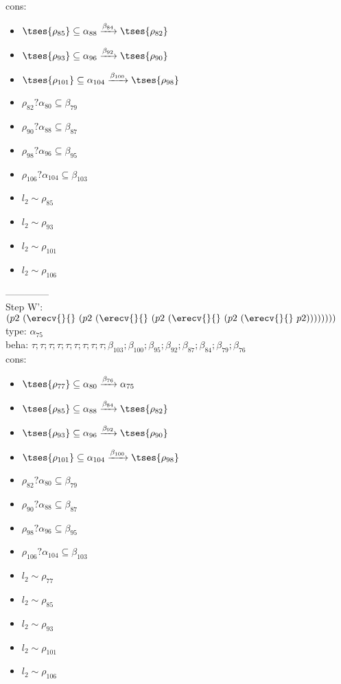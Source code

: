 \documentclass[12pt]{article}
\begin{document}
\\  cons: \begin{itemize}
\item $  \tses{ \rho_{85}} \subseteq \alpha_{88} \xrightarrow{\beta_{84}}  \tses{ \rho_{82}} $
\item $  \tses{ \rho_{93}} \subseteq \alpha_{96} \xrightarrow{\beta_{92}}  \tses{ \rho_{90}} $
\item $  \tses{ \rho_{101}} \subseteq \alpha_{104} \xrightarrow{\beta_{100}}  \tses{ \rho_{98}} $
\item $ \rho_{82}?\alpha_{80} \subseteq \beta_{79} $
\item $ \rho_{90}?\alpha_{88} \subseteq \beta_{87} $
\item $ \rho_{98}?\alpha_{96} \subseteq \beta_{95} $
\item $ \rho_{106}?\alpha_{104} \subseteq \beta_{103} $
\item $ l_{2} \sim\rho_{85} $
\item $ l_{2} \sim\rho_{93} $
\item $ l_{2} \sim\rho_{101} $
\item $ l_{2} \sim\rho_{106} $
\end{itemize} 
  --------------\\ 
Step W': $ (p2~(\erecv{}{}~(p2~(\erecv{}{}~(p2~(\erecv{}{}~(p2~(\erecv{}{}~p2)))))))) $\\
  type: $ \alpha_{75} $ 
\\  beha: $ \tau; \tau; \tau; \tau; \tau; \tau; \tau; \tau; \tau; \beta_{103}; \beta_{100}; \beta_{95}; \beta_{92}; \beta_{87}; \beta_{84}; \beta_{79}; \beta_{76} $ 
\\  cons: \begin{itemize}
\item $  \tses{ \rho_{77}} \subseteq \alpha_{80} \xrightarrow{\beta_{76}} \alpha_{75} $
\item $  \tses{ \rho_{85}} \subseteq \alpha_{88} \xrightarrow{\beta_{84}}  \tses{ \rho_{82}} $
\item $  \tses{ \rho_{93}} \subseteq \alpha_{96} \xrightarrow{\beta_{92}}  \tses{ \rho_{90}} $
\item $  \tses{ \rho_{101}} \subseteq \alpha_{104} \xrightarrow{\beta_{100}}  \tses{ \rho_{98}} $
\item $ \rho_{82}?\alpha_{80} \subseteq \beta_{79} $
\item $ \rho_{90}?\alpha_{88} \subseteq \beta_{87} $
\item $ \rho_{98}?\alpha_{96} \subseteq \beta_{95} $
\item $ \rho_{106}?\alpha_{104} \subseteq \beta_{103} $
\item $ l_{2} \sim\rho_{77} $
\item $ l_{2} \sim\rho_{85} $
\item $ l_{2} \sim\rho_{93} $
\item $ l_{2} \sim\rho_{101} $
\item $ l_{2} \sim\rho_{106} $
\end{itemize} 
\end{document}
